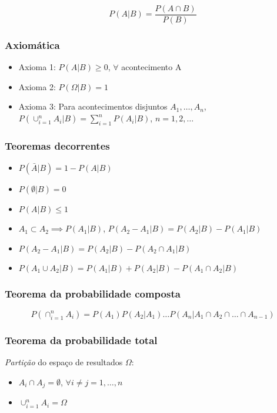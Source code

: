 \documentclass{article}
\begin{document}
$$ P(A|B) = \frac{P(A \cap B)}{P(B)} $$

\subsubsection*{Axiomática}

\begin{itemize}
    \item Axioma 1: $P(A|B) \geq 0$, $\forall$ acontecimento A
    \item Axioma 2: $P(\Omega|B) = 1$
    \item Axioma 3: Para acontecimentos disjuntos $A_1, \dots, A_n$, $P(\cup_{i=1}^n A_i|B) = \sum_{i=1}^n P(A_i|B)$, $n = 1, 2, \dots$
\end{itemize}

\subsubsection*{Teoremas decorrentes}

\begin{itemize}
    \item $P(\bar{A}|B) = 1 - P(A|B)$
    \item $P(\emptyset|B) = 0$
    \item $P(A|B) \leq 1$
    \item $A_1 \subset A_2 \implies P(A_1|B)$, $P(A_2-A_1|B) = P(A_2|B) - P(A_1|B)$
    \item $P(A_2 - A_1|B) = P(A_2|B) - P(A_2 \cap A_1|B)$
    \item $P(A_1 \cup A_2|B) = P(A_1|B) + P(A_2|B) - P(A_1 \cap A_2|B)$
\end{itemize}

\subsubsection*{Teorema da probabilidade composta}

$$ P(\cap_{i=1}^n A_i) = P(A_1)P(A_2|A_1)\dots P(A_n|A_1 \cap A_2 \cap \dots \cap A_{n-1}) $$

\subsubsection*{Teorema da probabilidade total}

\emph{Partição} do espaço de resultados $\Omega$:

\begin{itemize}
    \item $A_i \cap A_j = \emptyset$, $\forall i \neq j = 1, \dots, n$
    \item $\cup_{i=1}^n A_i = \Omega$
\end{itemize}
\end{document}
